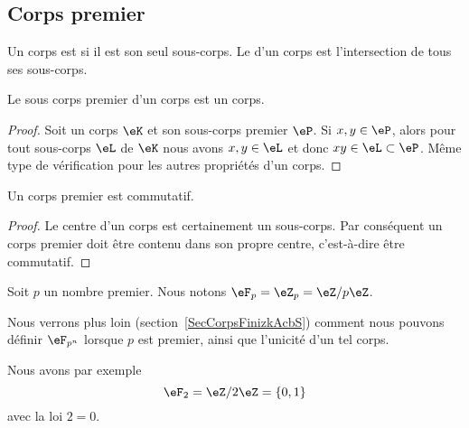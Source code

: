 \subsection{Corps premier}
\label{subseccorpspremhBlYIv}

\begin{definition}      \label{DEFooQSOFooIeSKpq}
	Un corps est  si il est son seul sous-corps. Le  d'un corps est l'intersection de tous ses sous-corps.
\end{definition}

\begin{lemma}   \label{LEMooPOGUooATyqcf}
	Le sous corps premier d'un corps est un corps.
\end{lemma}

\begin{proof}
	Soit un corps \( \eK\) et son sous-corps premier \( \eP\). Si \( x,y\in \eP\), alors pour tout sous-corps \( \eL\) de \( \eK\) nous avons \( x,y\in \eL\) et donc \( xy\in \eL\subset \eP\). Même type de vérification pour les autres propriétés d'un corps.
\end{proof}

\begin{lemma}
	Un corps premier est commutatif.
\end{lemma}

\begin{proof}
	Le centre d'un corps est certainement un sous-corps. Par conséquent un corps premier doit être contenu dans son propre centre, c'est-à-dire être commutatif.
\end{proof}

\begin{definition}  \label{DefXIHLooBAcqYH}
	Soit \( p\) un nombre premier. Nous notons \( \eF_p=\eZ_p=\eZ/p\eZ\).
\end{definition}

Nous verrons plus loin (section~\ref{SecCorpsFinizkAcbS}) comment nous pouvons définir \( \eF_{p^n}\) lorsque \( p\) est premier, ainsi que l'unicité d'un tel corps.

Nous avons par exemple
\begin{equation}
	\eF_2=\eZ/2\eZ=\{ 0,1 \}
\end{equation}
avec la loi \( 2=0\).

